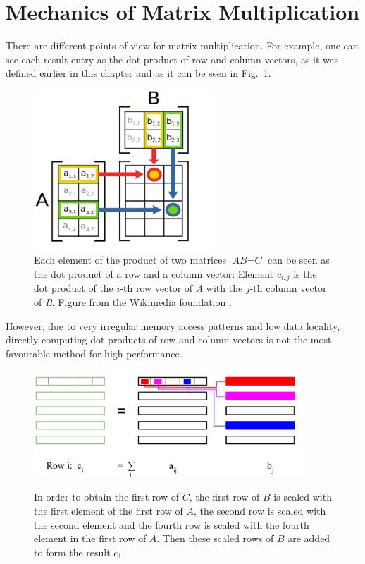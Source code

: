 \section{Mechanics of Matrix Multiplication}

There are different points of view for matrix multiplication. For example, one can see each result entry as the dot product of row and column vectors, as it was defined earlier in this chapter and as it can be seen in Fig.~\ref{fig:matmult_dot_product}.
\begin{figure}[tb]
\centering
 \includegraphics[height=6cm]{matrix_multiplication_wiki}
\caption{Each element of the product of two matrices $\textit{AB} = \textit{C}$ can be seen as the dot product of a row and a column vector: Element $c_{i,j}$ is the dot product of the $i$-th row vector of \textit{A} with the $j$-th column vector of \textit{B}. Figure from the Wikimedia foundation	 \cite{wiki:matrix_multiplication_image}.}
\label{fig:matmult_dot_product}
\end{figure}
However, due to very irregular memory access patterns and low data locality, directly computing dot products of row and column vectors is not the most favourable method for high performance. 



\begin{figure}[tb]
\centering
{\includegraphics[width=0.9\textwidth]{matrix_multiplication}}
\caption{In order to obtain the first row of $C$, the first row of $B$ is scaled with the first element of the first row of $A$, the second row is scaled with the second element and the fourth row is scaled with the fourth element in the first row of $A$. Then these scaled rows of $B$ are added to form the result $c_1$.}
\label{fig:matmult_petsc}
\end{figure}

